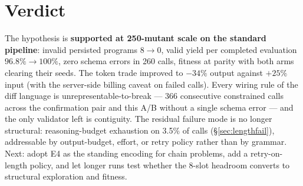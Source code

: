 \documentclass[11pt]{article}
\begin{document}
\section{Verdict}
The hypothesis is \textbf{supported at 250-mutant scale on the standard pipeline}: invalid
persisted programs $8\to0$, valid yield per completed evaluation $96.8\%\to100\%$, zero
schema errors in 260 calls, fitness at parity with both arms clearing their seeds. The
token trade improved to $-34\%$ output against $+25\%$ input (with the server-side billing
caveat on failed calls). Every wiring rule of the diff language is unrepresentable-to-break
--- 366 consecutive constrained calls across the confirmation pair and this A/B without a
single schema error --- and the only validator left is contiguity. The residual failure
mode is no longer structural: reasoning-budget exhaustion on 3.5\% of calls
(\S\ref{sec:lengthfail}), addressable by output-budget, effort, or retry policy rather than
by grammar. Next: adopt E4 as the standing encoding for chain problems, add a
retry-on-length policy, and let longer runs test whether the 8-slot headroom converts to
structural exploration and fitness.
\end{document}
